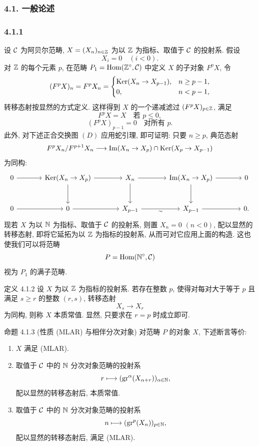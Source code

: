 \subsubsection*{4.1. 一般论述}
\subsubsection*{4.1.1}
设 $\mathcal C$ 为阿贝尔范畴, $X=(X_n)_{n\in\mathbb{Z}}$ 为以 $\mathbb{Z}$ 为指标、取值于 $\mathcal C$ 的投射系. 假设
\[
X_i=0\quad(i<0).
\]
对 $\mathbb{Z}$ 的每个元素 $p$, 在范畴 $P_1=\operatorname{Hom}(\mathbb{Z}^\circ,\mathcal C)$ 中定义 $X$ 的子对象 $F^pX$, 令
\[
(F^pX)_n=F^pX_n=
\begin{cases}
\operatorname{Ker}(X_n\to X_{p-1}),& n\ge p-1,\\
0,& n<p-1,
\end{cases}
\]
转移态射按显然的方式定义. 这样得到 $X$ 的一个递减滤过 $(F^pX)_{p\in\mathbb{Z}}$, 满足
\begin{equation}\tag{a}
F^pX=X\quad\text{若 }p\le0,
\end{equation}
\begin{equation}\tag{b}
(F^pX)_{p-1}=0\quad\text{对所有 }p.
\end{equation}
此外, 对下述正合交换图 $(D)$ 应用蛇引理, 即可证明: 只要 $n\ge p$, 典范态射
\[
F^pX_n/F^{p+1}X_n\longrightarrow \operatorname{Im}(X_n\to X_p)\cap\operatorname{Ker}(X_p\to X_{p-1})
\]
为同构:
\[
\begin{tikzcd}[column sep=large,row sep=large]
0 \arrow[r] & \Ker(X_n\to X_p) \arrow[r] \arrow[d] & X_n \arrow[r] \arrow[d] & \Im(X_n\to X_p) \arrow[r] \arrow[d] & 0\\
0 \arrow[r] & 0 \arrow[r] & X_{p-1} \arrow[r,"\sim"'] & X_{p-1} \arrow[r] & 0 .
\end{tikzcd}
\]
现若 $X$ 为以 $\mathbb N$ 为指标、取值于 $\mathcal C$ 的投射系, 则置 $X_n=0$ $(n<0)$, 配以显然的转移态射, 即将它延拓为以 $\mathbb{Z}$ 为指标的投射系, 从而可对它应用上面的构造. 这也使我们可以将范畴
\[
P=\operatorname{Hom}(\mathbb N^\circ,\mathcal C)
\]
视为 $P_1$ 的满子范畴.

\begin{statement}{定义 4.1.2}
设 $X$ 为以 $\mathbb{Z}$ 为指标的投射系. 若存在整数 $p$, 使得对每对大于等于 $p$ 且满足 $s\ge r$ 的整数 $(r,s)$, 转移态射
\[
X_s\longrightarrow X_r
\]
为同构, 则称 $X$ 本质常值. 显然, 只要求在 $r=p$ 时成立即可.
\end{statement}

\begin{statement}{命题 4.1.3 (性质 (MLAR) 与相伴分次对象)}
对范畴 $P$ 的对象 $X$, 下述断言等价:
\begin{enumerate}[label=(\roman*)]
\item $X$ 满足 (MLAR).
\item 取值于 $\mathcal C$ 中的 $\mathbb N$ 分次对象范畴的投射系
\[
r\longmapsto (\operatorname{gr}^\alpha(X_{\alpha+r}))_{\alpha\in\mathbb N},
\]
配以显然的转移态射后, 本质常值.
\item 取值于 $\mathcal C$ 中的 $\mathbb N$ 分次对象范畴的投射系
\[
n\longmapsto (\operatorname{gr}^p(X_n))_{p\in\mathbb N},
\]
配以显然的转移态射后, 满足 (MLAR).
\end{enumerate}
\end{statement}

